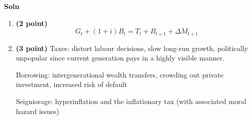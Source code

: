 \documentclass[14pt, oneside]{memoir}
\begin{document}
{{{\begin{enumerate}[label=\textbf{\arabic*.}, itemsep=15pt]
\begin{enumerate}
	
%	
\end{enumerate}

\clearpage
	\textbf{Soln}
\begin{enumerate}
	\item	\textbf{(2 point)} \[G_t + (1+i)B_t = T_t + B_{t+1} + \Delta M_{t+1}\]
	
	\item	\textbf{(3 point)} Taxes: distort labour decisions, slow long-run growth, politically unpopular since current generation pays in a highly visible manner.
	
	Borrowing: intergenerational wealth transfers, crowding out private	investment, increased risk of default
	
	Seigniorage: hyperinflation and the inflationary tax (with associated moral	hazard issues)
	
\end{enumerate}




%
%
%


\end{enumerate}}}}
\end{document}
